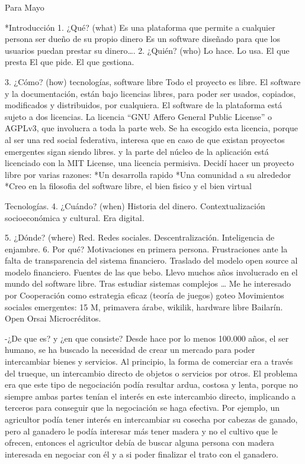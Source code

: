 Para Mayo

*Introducción
1. ¿Qué? (what)
Es una plataforma que permite a cualquier persona ser dueño de su propio dinero
Es un software diseñado para que los usuarios puedan prestar su dinero….
2. ¿Quién? (who) 
Lo hace. 
Lo usa.
El que presta
El que pide.
El que gestiona.

3. ¿Cómo? (how)
tecnologías, software libre
Todo el proyecto es libre. El software y la documentación, están bajo licencias libres, para poder ser usados, copiados, modificados y distribuidos, por cualquiera. El software de la plataforma  está sujeto a dos licencias. La licencia ``GNU Affero General Public License'' o AGPLv3, que involucra a toda la parte web. Se ha escogido esta licencia, porque al ser una red social federativa, interesa que en caso de que existan proyectos emergentes sigan siendo libres.  y la parte del núcleo de la aplicación está licenciado con la MIT License, una licencia permisiva.
Decidí hacer un proyecto libre por varias razones:
*Un desarrolla rapido
*Una comunidad a su alrededor
*Creo en la filosofia del software libre, el bien fisico y el bien virtual

Tecnologías.
4. ¿Cuándo? (when) 
Historia del dinero.
Contextualización socioeconómica y cultural. Era digital.

5. ¿Dónde? (where) 
Red. Redes sociales.
Descentralización. Inteligencia de enjambre.
6. Por qué?
Motivaciones en primera persona.
Frustraciones ante la falta de transparencia del sistema financiero.
Traslado del modelo open source al modelo financiero. 
Fuentes de las que bebo.
Llevo muchos años involucrado en el mundo del software libre.
Tras estudiar sistemas complejos … 
Me he interesado por Cooperación como estrategia eficaz (teoría de juegos)
goteo
Movimientos sociales emergentes: 15 M, primavera  árabe, wikilik, hardware libre
Bailarín.
Open 
Orsai 
Microcréditos.

-¿De que es? y ¿en que consiste?
Desde hace por lo menos 100.000 años, el ser humano, se ha buscado la necesidad de crear un mercado para poder intercambiar bienes y servicios. Al principio, la forma de comerciar era a través del trueque, un intercambio directo de objetos o servicios por otros. El problema era que este tipo de negociación podía resultar ardua, costosa y lenta, porque no siempre ambas partes tenían el interés en este intercambio directo, implicando a terceros para conseguir que la negociación se haga efectiva. Por ejemplo, un agricultor podía tener interés en intercambiar su cosecha por cabezas de ganado, pero al ganadero le podía interesar más tener madera y no el cultivo que le ofrecen, entonces el agricultor debía de buscar alguna persona con madera interesada en negociar con él y a si poder finalizar el trato con el ganadero. 

